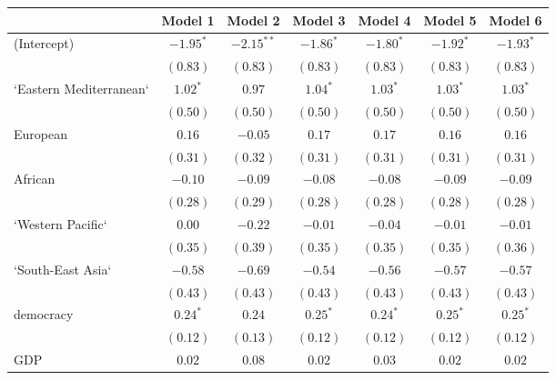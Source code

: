 
\begin{table}[!h]
\begin{center}
\begin{tabular}{l c c c c c c }
\toprule
 & Model 1 & Model 2 & Model 3 & Model 4 & Model 5 & Model 6 \\
\midrule
(Intercept)             & $-1.95^{*}$  & $-2.15^{**}$ & $-1.86^{*}$  & $-1.80^{*}$  & $-1.92^{*}$  & $-1.93^{*}$  \\
                        & $(0.83)$     & $(0.83)$     & $(0.83)$     & $(0.83)$     & $(0.83)$     & $(0.83)$     \\
`Eastern Mediterranean` & $1.02^{*}$   & $0.97$       & $1.04^{*}$   & $1.03^{*}$   & $1.03^{*}$   & $1.03^{*}$   \\
                        & $(0.50)$     & $(0.50)$     & $(0.50)$     & $(0.50)$     & $(0.50)$     & $(0.50)$     \\
European                & $0.16$       & $-0.05$      & $0.17$       & $0.17$       & $0.16$       & $0.16$       \\
                        & $(0.31)$     & $(0.32)$     & $(0.31)$     & $(0.31)$     & $(0.31)$     & $(0.31)$     \\
African                 & $-0.10$      & $-0.09$      & $-0.08$      & $-0.08$      & $-0.09$      & $-0.09$      \\
                        & $(0.28)$     & $(0.29)$     & $(0.28)$     & $(0.28)$     & $(0.28)$     & $(0.28)$     \\
`Western Pacific`       & $0.00$       & $-0.22$      & $-0.01$      & $-0.04$      & $-0.01$      & $-0.01$      \\
                        & $(0.35)$     & $(0.39)$     & $(0.35)$     & $(0.35)$     & $(0.35)$     & $(0.36)$     \\
`South-East Asia`       & $-0.58$      & $-0.69$      & $-0.54$      & $-0.56$      & $-0.57$      & $-0.57$      \\
                        & $(0.43)$     & $(0.43)$     & $(0.43)$     & $(0.43)$     & $(0.43)$     & $(0.43)$     \\
democracy               & $0.24^{*}$   & $0.24$       & $0.25^{*}$   & $0.24^{*}$   & $0.25^{*}$   & $0.25^{*}$   \\
                        & $(0.12)$     & $(0.13)$     & $(0.12)$     & $(0.12)$     & $(0.12)$     & $(0.12)$     \\
GDP                     & $0.02$       & $0.08$       & $0.02$       & $0.03$       & $0.02$       & $0.02$       \\

\end{tabular}
\end{center}
\end{table}
